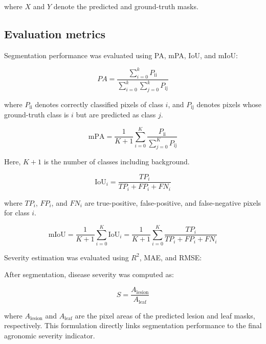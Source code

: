 \documentclass[
]{article}
\begin{document}
where \(X\) and \(Y\) denote the predicted and ground-truth masks.

\hypertarget{evaluation-metrics}{%
\subsection{Evaluation metrics}\label{evaluation-metrics}}

Segmentation performance was evaluated using PA, mPA, IoU, and mIoU:

\begin{equation}
PA = \frac{\sum_{i = 0}^{k}P_{\text{ii}}}{\sum_{i = 0}^{k}{\sum_{j = 0}^{k}P_{\text{ij}}}}
\tag{2}
\end{equation}

where \(P_{\text{ii}}\) denotes correctly classified pixels of class
\(i\), and \(P_{\text{ij}}\) denotes pixels whose ground-truth class is
\(i\) but are predicted as class \(j\).

\begin{equation}
\text{mPA} = \frac{1}{K + 1}\sum_{i = 0}^{K}\frac{P_{\text{ii}}}{\sum_{j = 0}^{K} P_{\text{ij}}}
\tag{3}
\end{equation}

Here, \(K+1\) is the number of classes including background.

\begin{equation}
\text{IoU}_{i} = \frac{TP_{i}}{TP_{i} + FP_{i} + FN_{i}}
\tag{4}
\end{equation}

where \(TP_{i}\), \(FP_{i}\), and \(FN_{i}\) are true-positive,
false-positive, and false-negative pixels for class \(i\).

\begin{equation}
\text{mIoU} = \frac{1}{K + 1}\sum_{i = 0}^{K}\text{IoU}_{i}
= \frac{1}{K + 1}\sum_{i = 0}^{K}\frac{TP_{i}}{TP_{i} + FP_{i} + FN_{i}}
\tag{5}
\end{equation}

Severity estimation was evaluated using \(R^{2}\), MAE, and RMSE:

After segmentation, disease severity was computed as:

\begin{equation}
S = \frac{A_{\text{lesion}}}{A_{\text{leaf}}}
\tag{9}
\end{equation}

where \(A_{\text{lesion}}\) and \(A_{\text{leaf}}\) are the pixel areas
of the predicted lesion and leaf masks, respectively. This formulation
directly links segmentation performance to the final agronomic severity
indicator.
\end{document}
